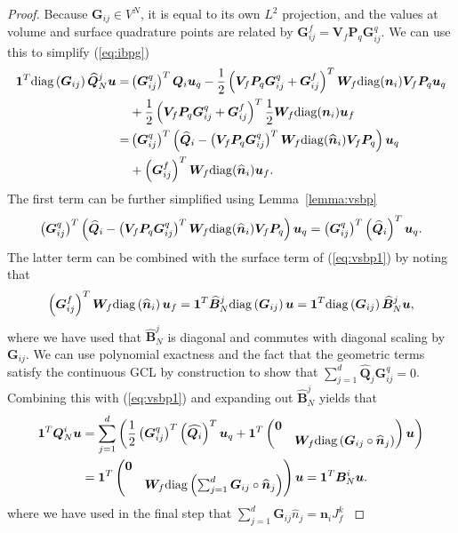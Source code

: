 \documentclass[review]{siamart0216}
\theoremstyle{assumption}
\renewcommand{\hat}[1]{\widehat{#1}}
\newcommand{\LRp}[1]{\left( #1 \right)}
\newcommand{\diag}[1]{{\rm diag}\LRp{#1}}
\begin{document}
\begin{proof}
Because $\bm{G}_{ij} \in V^N$, it is equal to its own $L^2$ projection, and the values at volume and surface quadrature points are related by $\bm{G}^f_{ij} = \bm{V}_f\bm{P}_q\bm{G}^q_{ij}$.  We can use this to simplify (\ref{eq:ibpg})
\begin{align*}
\bm{1}^T \diag{\bm{G}_{ij}} \hat{\bm{Q}}^j_N \bm{u} =&  \LRp{\bm{G}^q_{ij}}^T { \bm{Q}_i}  \bm{u}_q - \frac{1}{2} \LRp{{\bm{V}_f \bm{P}_q}\bm{G}_{ij}^q+\bm{G}^f_{ij}}^T{\bm{W}_f{\rm diag}({\bm{n}}_i)\bm{V}_f\bm{P}_q}\bm{u}_q\\
&+ \frac{1}{2} \LRp{{\bm{V}_f \bm{P}_q}\bm{G}_{ij}^q+\bm{G}^f_{ij}}^T\frac{1}{2}\bm{W}_f{\rm diag}({\bm{n}}_i)\bm{u}_f\\
=& \LRp{\bm{G}^q_{ij}}^T \LRp{ \hat{\bm{Q}}_i - \LRp{{\bm{V}_f \bm{P}_q}\bm{G}_{ij}^q}^T{\bm{W}_f{\rm diag}(\hat{\bm{n}}_i)\bm{V}_f\bm{P}_q}}\bm{u}_q \\
&+ \LRp{\bm{G}^f_{ij}}^T\bm{W}_f{\rm diag}(\hat{\bm{n}}_i)\bm{u}_f. %
\end{align*}
The first term can be further simplified using Lemma~\ref{lemma:vsbp}
\[
\LRp{\bm{G}^q_{ij}}^T \LRp{ \hat{\bm{Q}}_i - \LRp{{\bm{V}_f \bm{P}_q}\bm{G}_{ij}^q}^T{\bm{W}_f{\rm diag}(\hat{\bm{n}}_i)\bm{V}_f\bm{P}_q}}\bm{u}_q = \LRp{\bm{G}^q_{ij}}^T \LRp{ \hat{\bm{Q}}_i}^T\bm{u}_q.
\]
The latter term can be combined with the surface term of (\ref{eq:vsbp1}) by noting that 
\[
\LRp{\bm{G}^f_{ij}}^T\bm{W}_f \diag{\hat{\bm{n}}_i}\bm{u}_f =\bm{1}^T\hat{\bm{B}}^j_N\diag{\bm{G}_{ij}}\bm{u} = \bm{1}^T\diag{\bm{G}_{ij}}\hat{\bm{B}}^j_N\bm{u},
\]
where we have used that $\hat{\bm{B}}^j_N$ is diagonal and commutes with diagonal scaling by $\bm{G}_{ij}$.
We can use polynomial exactness and the fact that the geometric terms satisfy the continuous GCL by construction \cite{chan2018discretely} to show that $\sum_{j=1}^d  \hat{\bm{Q}}_j {\bm{G}^q_{ij}} = 0$.
Combining this with (\ref{eq:vsbp1}) and expanding out $\hat{\bm{B}}^j_N$ yields that
\begin{align*}
\bm{1}^T\bm{Q}^i_N\bm{u} &= \sum_{j=1}^d \LRp{
\frac{1}{2}\LRp{\bm{G}^q_{ij}}^T \LRp{ \hat{\bm{Q}_i}}^T \bm{u}_q + \bm{1}^T\begin{pmatrix}
\bm{0} &\\
& \bm{W}_f \diag{\bm{G}_{ij} \circ \hat{\bm{n}}_j}
\end{pmatrix}
\bm{u}} \\
&=  \bm{1}^T\begin{pmatrix}
\bm{0} &\\
& \bm{W}_f \diag{\sum_{j=1}^d \bm{G}_{ij} \circ \hat{\bm{n}}_j}
\end{pmatrix}
\bm{u} = \bm{1}^T\bm{B}^i_N\bm{u}.
\end{align*}
where we have used in the final step that $\sum_{j=1}^d\bm{G}_{ij}\hat{n}_j = \bm{n}_i J^k_f$ \cite{ciarlet1978finite, chan2018discretely}
\end{proof}
\end{document}
